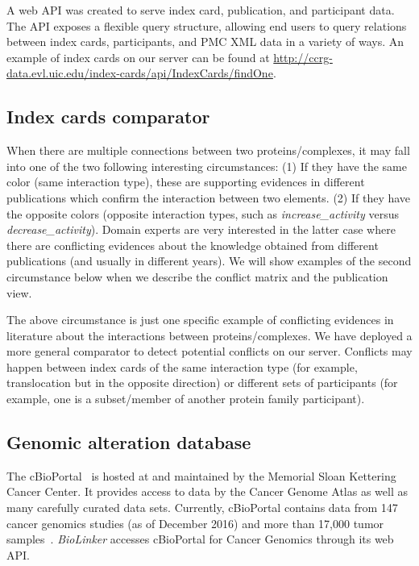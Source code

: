 \documentclass[journal]{vgtc}                %
\newcommand{\theName}{\textit{BioLinker}}
\begin{document}
A web API was created to serve index card, publication, and participant data. The API exposes a flexible query structure, allowing end users to query relations between index cards, participants, and PMC XML data in a variety of ways. An example of index cards on our server can be found at \url{http://ccrg-data.evl.uic.edu/index-cards/api/IndexCards/findOne}.


\subsection{Index cards comparator}
\label{sec:Comparator}
When there are multiple connections between two proteins/complexes, it may fall into one of the two following interesting circumstances: (1) If they have the same color (same interaction type), these are supporting evidences in different publications which confirm the interaction between two elements. (2) If they have the opposite colors (opposite interaction types, such as \textit{increase\_activity} versus \textit{decrease\_activity}). Domain experts are very interested in the latter case where there are conflicting evidences about the knowledge obtained from different publications (and usually in different years). 
We will show examples of the second circumstance below when we describe the conflict matrix and the publication view.  %

The above circumstance is just one specific example of conflicting evidences in literature about the interactions between proteins/complexes. We have deployed a more general comparator to detect potential conflicts on our server. Conflicts may happen between index cards of the same interaction type (for example, translocation but in the opposite direction) or different sets of participants (for example, one is a subset/member of another protein family participant). 

\subsection{Genomic alteration database}
\label{sec:cBioPortal}
The cBioPortal~\cite{cBioPortal2013} is hosted at and maintained by the Memorial Sloan Kettering Cancer Center. It provides access to data by the Cancer Genome Atlas as well as many carefully curated data sets. Currently, cBioPortal contains data from 147 cancer genomics studies (as of December 2016) and more than 17,000 tumor samples~\cite{ChiBE2_2014}. \theName{} accesses cBioPortal for Cancer Genomics through its web API. 
\end{document}
